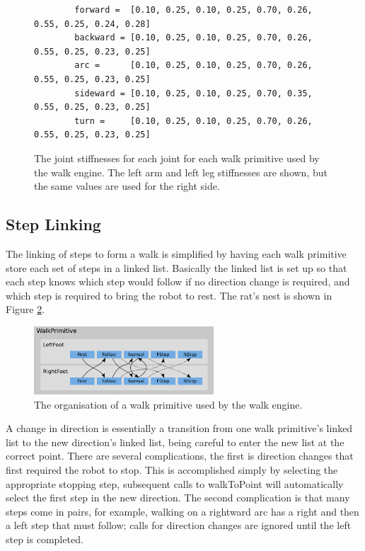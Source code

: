 \begin{figure}
	\begin{center}
		{\scriptsize\begin{verbatim}
		forward =  [0.10, 0.25, 0.10, 0.25, 0.70, 0.26, 0.55, 0.25, 0.24, 0.28]
		backward = [0.10, 0.25, 0.10, 0.25, 0.70, 0.26, 0.55, 0.25, 0.23, 0.25]
		arc =      [0.10, 0.25, 0.10, 0.25, 0.70, 0.26, 0.55, 0.25, 0.23, 0.25]
		sideward = [0.10, 0.25, 0.10, 0.25, 0.70, 0.35, 0.55, 0.25, 0.23, 0.25]
		turn =     [0.10, 0.25, 0.10, 0.25, 0.70, 0.26, 0.55, 0.25, 0.23, 0.25]
		\end{verbatim}}
		\caption{The joint stiffnesses for each joint for each walk primitive used by the walk engine. The left arm and left leg stiffnesses are shown, but the same values are used for the right side.}
		\label{fig:LocomotionWalkParameters2}
	\end{center}
\end{figure}

\subsection{Step Linking}

The linking of steps to form a walk is simplified by having each walk primitive store each set of steps in a linked list. Basically the linked list is set up so that each step knows which step would follow if no direction change is required, and which step is required to bring the robot to rest. The rat's nest is shown in Figure \ref{LocomotionLinkedSteps}.

\begin{figure}[tbh]
	\begin{center}
		\includegraphics[width=0.6\textwidth]{locomotionfigs/linkedsteps.png}
		\caption{The organisation of a walk primitive used by the walk engine.}
		\label{LocomotionLinkedSteps}
	\end{center}
\end{figure}

A change in direction is essentially a transition from one walk primitive's linked list to the new direction's linked list, being careful to enter the new list at the correct point. There are several complications, the first is direction changes that first required the robot to stop. This is accomplished simply by selecting the appropriate stopping step, subsequent calls to walkToPoint will automatically select the first step in the new direction. The second complication is that many steps come in pairs, for example, walking on a rightward arc has a right and then a left step that must follow; calls for direction changes are ignored until the left step is completed. 

